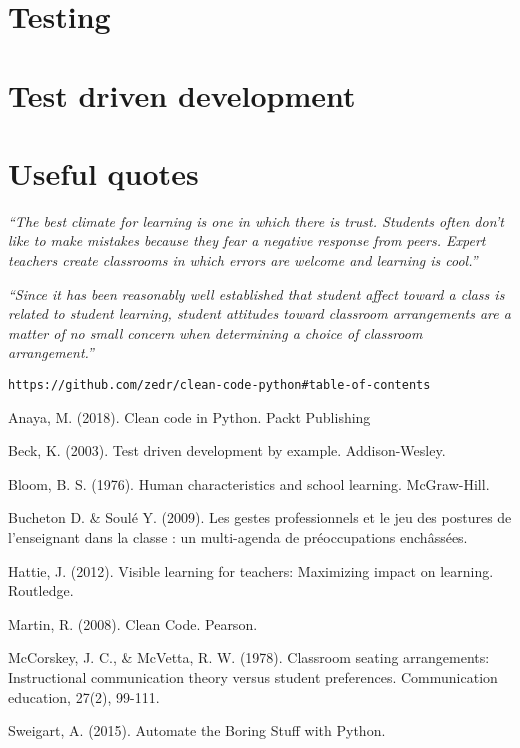 \documentclass[10pt]{article}
\begin{document}
\section{Testing}

\section{Test driven development}

\section{Useful quotes}
 
\begin{center} 
\emph{``The best climate for learning is one in which there is trust. Students often don’t like to make mistakes because they fear a negative response from peers. Expert teachers create classrooms in which errors are welcome and learning is cool.''} \cite{Hat12}
\end{center}
 
\begin{center} 
\emph{``Since it has been reasonably well established that student affect toward a class is related to student learning, student attitudes toward classroom arrangements are a matter of no small concern when determining a choice of classroom arrangement.''} \cite{MM78}
\end{center}

\begin{verbatim}
https://github.com/zedr/clean-code-python#table-of-contents
\end{verbatim}

\begin{thebibliography}{2}

 Anaya, M. (2018). Clean code in Python. Packt Publishing

 Beck, K. (2003). Test driven development by example. Addison-Wesley.

 Bloom, B. S. (1976). Human characteristics and school learning. McGraw-Hill.

 Bucheton D. \& Soulé Y. (2009). Les gestes professionnels et le jeu des postures de l’enseignant dans la classe : un multi-agenda de préoccupations enchâssées.

 Hattie, J. (2012). Visible learning for teachers: Maximizing impact on learning. Routledge.

 Martin, R. (2008). Clean Code. Pearson.

 McCorskey, J. C., \& McVetta, R. W. (1978). Classroom seating arrangements: Instructional communication theory versus student preferences. Communication education, 27(2), 99-111.

 Sweigart, A. (2015). Automate the Boring Stuff with Python.
\end{thebibliography}
\end{document}
